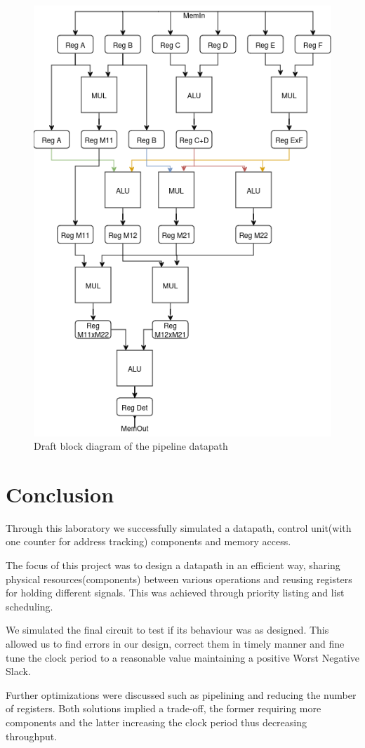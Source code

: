 \documentclass[12pt]{article}
\begin{document}
\begin{figure}[H]
	\centering
	\includegraphics[width=0.7\linewidth]{images/pipe.png}
	\caption{Draft block diagram of the pipeline datapath}
	\label{fig:pipe}
\end{figure}

\section{Conclusion}
Through this laboratory we successfully simulated a datapath, control unit(with one counter for address tracking) components and memory access.

The focus of this project was to design a datapath in an efficient way, sharing physical resources(components) between various operations and reusing registers for holding different signals. This was achieved through priority listing and list scheduling.
  
We simulated the final circuit to test if its behaviour was as designed. This allowed us to
find errors in our design, correct them in timely manner and fine tune the clock period to a reasonable value maintaining a positive Worst Negative Slack.

Further optimizations were discussed such as pipelining and reducing the number of registers. Both solutions implied a trade-off, the former requiring more components and the latter increasing the clock period thus decreasing throughput.
\end{document}
